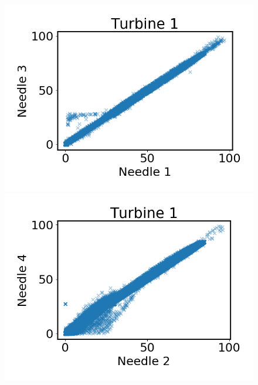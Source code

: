         \begin{figure}
            \begin{minipage}[b]{0.5\linewidth}
                \centering
                \includegraphics[width=\textwidth]{report/figures/data/t1_n1_n3.png}
            \end{minipage}
            \begin{minipage}[b]{0.5\linewidth}
                \centering
                \includegraphics[width=\textwidth]{report/figures/data/t1_n2_n4.png}
            \end{minipage}
            \begin{minipage}[b]{0.5\linewidth}
                \centering

\end{minipage}
\end{figure}

